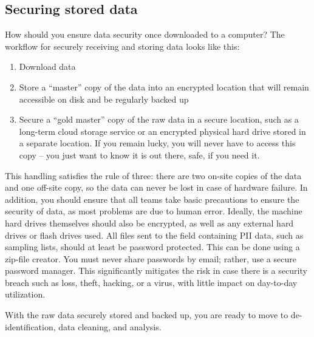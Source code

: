 \subsection{Securing stored data}
How should you ensure data security once downloaded to a computer? 
The workflow for securely receiving and storing data looks like this:

\begin{enumerate}
	\item Download data
	\item Store a ``master'' copy of the data into an encrypted location that will remain accessible on disk and be regularly backed up
	\item Secure a ``gold master'' copy of the raw data in a secure location, such as a long-term cloud storage service or an encrypted physical hard drive stored in a separate location. If you remain lucky, you will never have to access this copy -- you just want to know it is out there, safe, if you need it.
	
\end{enumerate}

This handling satisfies the rule of three: there are two on-site copies of the data and one off-site copy, so the data can never be lost in case of hardware failure. In addition, you should ensure that all teams take basic precautions to ensure the security of data, as most problems are due to human error.
Ideally, the machine hard drives themselves should also be encrypted, as well as any external hard drives or flash drives used. All files sent to the field containing PII data, such as sampling lists, should at least be password protected. This can be done using a zip-file creator.
You must never share passwords by email; rather, use a secure password manager. This significantly mitigates the risk in case there is a security breach such as loss, theft, hacking, or a virus, with little impact on day-to-day utilization.


With the raw data securely stored and backed up, you are ready to move to de-identification, data cleaning, and analysis.


